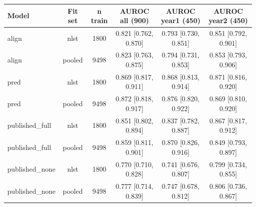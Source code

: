 \begin{tabular}{lccccc}
\toprule
Model & Fit set & n train & AUROC all (900) & AUROC year1 (450) & AUROC year2 (450) \\
\midrule
align & nlst & 1800 & 0.821 [0.762, 0.870] & 0.793 [0.730, 0.851] & 0.851 [0.792, 0.901] \\
align & pooled & 9498 & 0.823 [0.763, 0.875] & 0.794 [0.731, 0.853] & 0.853 [0.793, 0.906] \\
pred & nlst & 1800 & 0.869 [0.817, 0.911] & 0.868 [0.813, 0.914] & 0.871 [0.816, 0.920] \\
pred & pooled & 9498 & 0.872 [0.818, 0.917] & 0.876 [0.820, 0.922] & 0.869 [0.810, 0.920] \\
published_full & nlst & 1800 & 0.851 [0.802, 0.894] & 0.837 [0.782, 0.887] & 0.867 [0.817, 0.912] \\
published_full & pooled & 9498 & 0.859 [0.811, 0.901] & 0.870 [0.826, 0.916] & 0.849 [0.793, 0.897] \\
published_none & nlst & 1800 & 0.770 [0.710, 0.828] & 0.741 [0.676, 0.807] & 0.799 [0.734, 0.855] \\
published_none & pooled & 9498 & 0.777 [0.714, 0.839] & 0.747 [0.678, 0.812] & 0.806 [0.736, 0.867] \\
\bottomrule
\end{tabular}
